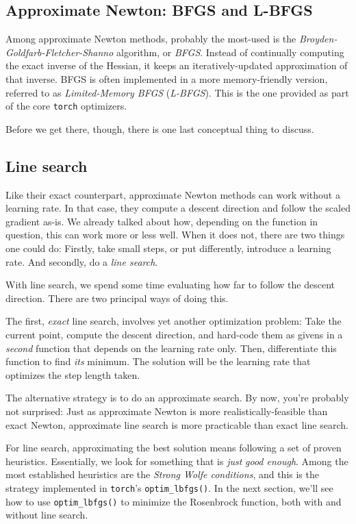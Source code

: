 \documentclass[
  letterpaper,
]{krantz}
\begin{document}
\hypertarget{approximate-newton-bfgs-and-l-bfgs}{%
\subsection{Approximate Newton: BFGS and
L-BFGS}\label{approximate-newton-bfgs-and-l-bfgs}}

Among approximate Newton methods, probably the most-used is the
\emph{Broyden-Goldfarb-Fletcher-Shanno} algorithm, or \emph{BFGS}.
Instead of continually computing the exact inverse of the Hessian, it
keeps an iteratively-updated approximation of that inverse. BFGS is
often implemented in a more memory-friendly version, referred to as
\emph{Limited-Memory BFGS} (\emph{L-BFGS}). This is the one provided as
part of the core \texttt{torch} optimizers.

Before we get there, though, there is one last conceptual thing to
discuss.

\hypertarget{line-search}{%
\subsection{Line search}\label{line-search}}

Like their exact counterpart, approximate Newton methods can work
without a learning rate. In that case, they compute a descent direction
and follow the scaled gradient as-is. We already talked about how,
depending on the function in question, this can work more or less well.
When it does not, there are two things one could do: Firstly, take small
steps, or put differently, introduce a learning rate. And secondly, do a
\emph{line search}.

With line search, we spend some time evaluating how far to follow the
descent direction. There are two principal ways of doing this.

The first, \emph{exact} line search, involves yet another optimization
problem: Take the current point, compute the descent direction, and
hard-code them as givens in a \emph{second} function that depends on the
learning rate only. Then, differentiate this function to find \emph{its}
minimum. The solution will be the learning rate that optimizes the step
length taken.

The alternative strategy is to do an approximate search. By now, you're
probably not surprised: Just as approximate Newton is more
realistically-feasible than exact Newton, approximate line search is
more practicable than exact line search.

For line search, approximating the best solution means following a set
of proven heuristics. Essentially, we look for something that is
\emph{just} \emph{good enough}. Among the most established heuristics
are the \emph{Strong Wolfe conditions}, and this is the strategy
implemented in \texttt{torch}'s \texttt{optim\_lbfgs()}. In the next
section, we'll see how to use \texttt{optim\_lbfgs()} to minimize the
Rosenbrock function, both with and without line search.
\end{document}
